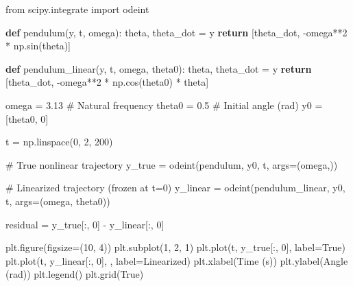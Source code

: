 \documentclass[
  letterpaper,
  DIV=11,
  numbers=noendperiod]{scrartcl}
\newenvironment{Shaded}{\begin{snugshade}}{\end{snugshade}}
\newcommand{\CommentTok}[1]{\textcolor[rgb]{0.37,0.37,0.37}{#1}}
\newcommand{\ControlFlowTok}[1]{\textcolor[rgb]{0.00,0.23,0.31}{\textbf{#1}}}
\newcommand{\DecValTok}[1]{\textcolor[rgb]{0.68,0.00,0.00}{#1}}
\newcommand{\FloatTok}[1]{\textcolor[rgb]{0.68,0.00,0.00}{#1}}
\newcommand{\ImportTok}[1]{\textcolor[rgb]{0.00,0.46,0.62}{#1}}
\newcommand{\KeywordTok}[1]{\textcolor[rgb]{0.00,0.23,0.31}{\textbf{#1}}}
\newcommand{\NormalTok}[1]{\textcolor[rgb]{0.00,0.23,0.31}{#1}}
\newcommand{\OperatorTok}[1]{\textcolor[rgb]{0.37,0.37,0.37}{#1}}
\newcommand{\StringTok}[1]{\textcolor[rgb]{0.13,0.47,0.30}{#1}}
\newcommand{\VariableTok}[1]{\textcolor[rgb]{0.07,0.07,0.07}{#1}}
\begin{document}
\begin{Shaded}
\begin{Highlighting}[]
\ImportTok{from}\NormalTok{ scipy.integrate }\ImportTok{import}\NormalTok{ odeint}

\KeywordTok{def}\NormalTok{ pendulum(y, t, omega):}
\NormalTok{    theta, theta\_dot }\OperatorTok{=}\NormalTok{ y}
    \ControlFlowTok{return}\NormalTok{ [theta\_dot, }\OperatorTok{{-}}\NormalTok{omega}\OperatorTok{**}\DecValTok{2} \OperatorTok{*}\NormalTok{ np.sin(theta)]}

\KeywordTok{def}\NormalTok{ pendulum\_linear(y, t, omega, theta0):}
\NormalTok{    theta, theta\_dot }\OperatorTok{=}\NormalTok{ y}
    \ControlFlowTok{return}\NormalTok{ [theta\_dot, }\OperatorTok{{-}}\NormalTok{omega}\OperatorTok{**}\DecValTok{2} \OperatorTok{*}\NormalTok{ np.cos(theta0) }\OperatorTok{*}\NormalTok{ theta]}

\NormalTok{omega }\OperatorTok{=} \FloatTok{3.13}  \CommentTok{\# Natural frequency}
\NormalTok{theta0 }\OperatorTok{=} \FloatTok{0.5}  \CommentTok{\# Initial angle (rad)}
\NormalTok{y0 }\OperatorTok{=}\NormalTok{ [theta0, }\DecValTok{0}\NormalTok{]}

\NormalTok{t }\OperatorTok{=}\NormalTok{ np.linspace(}\DecValTok{0}\NormalTok{, }\DecValTok{2}\NormalTok{, }\DecValTok{200}\NormalTok{)}

\CommentTok{\# True nonlinear trajectory}
\NormalTok{y\_true }\OperatorTok{=}\NormalTok{ odeint(pendulum, y0, t, args}\OperatorTok{=}\NormalTok{(omega,))}

\CommentTok{\# Linearized trajectory (frozen at t=0)}
\NormalTok{y\_linear }\OperatorTok{=}\NormalTok{ odeint(pendulum\_linear, y0, t, args}\OperatorTok{=}\NormalTok{(omega, theta0))}

\NormalTok{residual }\OperatorTok{=}\NormalTok{ y\_true[:, }\DecValTok{0}\NormalTok{] }\OperatorTok{{-}}\NormalTok{ y\_linear[:, }\DecValTok{0}\NormalTok{]}

\NormalTok{plt.figure(figsize}\OperatorTok{=}\NormalTok{(}\DecValTok{10}\NormalTok{, }\DecValTok{4}\NormalTok{))}
\NormalTok{plt.subplot(}\DecValTok{1}\NormalTok{, }\DecValTok{2}\NormalTok{, }\DecValTok{1}\NormalTok{)}
\NormalTok{plt.plot(t, y\_true[:, }\DecValTok{0}\NormalTok{], label}\OperatorTok{=}\StringTok{\textquotesingle{}True\textquotesingle{}}\NormalTok{)}
\NormalTok{plt.plot(t, y\_linear[:, }\DecValTok{0}\NormalTok{], }\StringTok{\textquotesingle{}{-}{-}\textquotesingle{}}\NormalTok{, label}\OperatorTok{=}\StringTok{\textquotesingle{}Linearized\textquotesingle{}}\NormalTok{)}
\NormalTok{plt.xlabel(}\StringTok{\textquotesingle{}Time (s)\textquotesingle{}}\NormalTok{)}
\NormalTok{plt.ylabel(}\StringTok{\textquotesingle{}Angle (rad)\textquotesingle{}}\NormalTok{)}
\NormalTok{plt.legend()}
\NormalTok{plt.grid(}\VariableTok{True}\NormalTok{)}


\end{Highlighting}
\end{Shaded}
\end{document}
